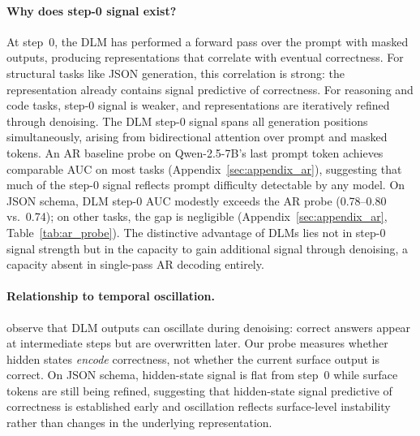 \documentclass[11pt]{article}
\begin{document}
\paragraph{Why does step-0 signal exist?}
At step~0, the DLM has performed a forward pass over the prompt with masked outputs, producing representations that correlate with eventual correctness.
For structural tasks like JSON generation, this correlation is strong: the representation already contains signal predictive of correctness.
For reasoning and code tasks, step-0 signal is weaker, and representations are iteratively refined through denoising.
The DLM step-0 signal spans all generation positions simultaneously, arising from bidirectional attention over prompt and masked tokens.
An AR baseline probe on Qwen-2.5-7B's last prompt token achieves comparable AUC on most tasks (Appendix~\ref{sec:appendix_ar}), suggesting that much of the step-0 signal reflects prompt difficulty detectable by any model. On JSON schema, DLM step-0 AUC modestly exceeds the AR probe (0.78--0.80 vs.\ 0.74); on other tasks, the gap is negligible (Appendix~\ref{sec:appendix_ar}, Table~\ref{tab:ar_probe}). The distinctive advantage of DLMs lies not in step-0 signal strength but in the capacity to gain additional signal through denoising, a capacity absent in single-pass AR decoding entirely.

\paragraph{Relationship to temporal oscillation.}
\citet{wang2025time} observe that DLM outputs can oscillate during denoising: correct answers appear at intermediate steps but are overwritten later.
Our probe measures whether hidden states \emph{encode} correctness, not whether the current surface output is correct.
On JSON schema, hidden-state signal is flat from step~0 while surface tokens are still being refined, suggesting that hidden-state signal predictive of correctness is established early and oscillation reflects surface-level instability rather than changes in the underlying representation.
\end{document}
